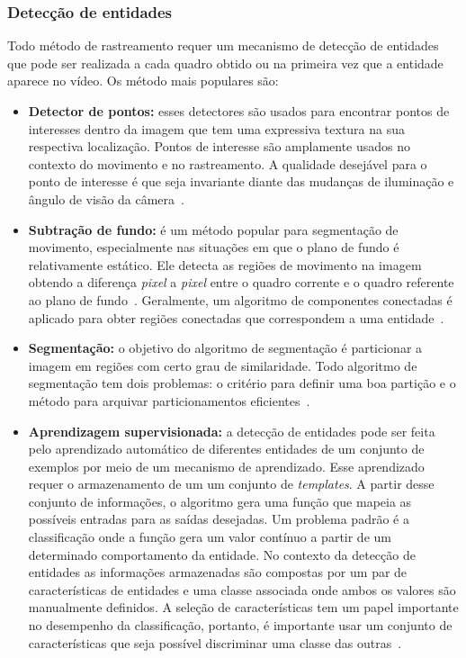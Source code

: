 \subsubsection{Detecção de entidades}
\label{sec:deteccao-objeto}

	Todo método de rastreamento requer um mecanismo de detecção de entidades que
	pode ser realizada a cada quadro obtido ou na primeira vez que a
	entidade aparece no vídeo. Os método mais populares são:


	\begin{itemize}
		\item \textbf{Detector de pontos:} esses detectores são usados para encontrar
		pontos de interesses dentro da imagem que tem uma expressiva textura na sua
		respectiva localização. Pontos de interesse são amplamente usados no contexto do
		movimento e no rastreamento. A qualidade desejável para o ponto de interesse é
		que seja invariante diante das mudanças de iluminação e ângulo de visão da
		câmera~\cite{yilmaz}.
			
		\item \textbf{Subtração de fundo:} é um método popular para segmentação de
		movimento, especialmente nas situações em que o plano de fundo é relativamente
		estático. Ele detecta as regiões de movimento na imagem obtendo a diferença
		\textit{pixel} a \textit{pixel} entre o quadro corrente e o
		quadro referente ao plano de fundo~\cite{weiming}. Geralmente, um
		algoritmo de componentes conectadas é aplicado para obter regiões conectadas que
		correspondem a uma entidade~\cite{yilmaz}.
		
		\item \textbf{Segmentação:} o objetivo do algoritmo de segmentação é particionar
		a imagem em regiões com certo grau de similaridade. Todo algoritmo de
		segmentação tem dois problemas: o critério para definir uma boa partição e o
		método para arquivar particionamentos eficientes~\cite{yilmaz, shi}.

		\item \textbf{Aprendizagem supervisionada:} a detecção de entidades pode ser
		feita pelo aprendizado automático de diferentes entidades de um conjunto de
		exemplos por meio de um mecanismo de aprendizado. Esse aprendizado requer o
		armazenamento de um um conjunto de \textit{templates}. A partir desse conjunto
		de informações, o algoritmo gera uma função que mapeia as possíveis entradas
		para as saídas desejadas. Um problema padrão é a classificação onde a função
		gera um valor contínuo a partir de um determinado comportamento da entidade. No
		contexto da detecção de entidades as informações armazenadas são compostas por
		um par de características de entidades e uma classe associada onde ambos os
		valores são manualmente definidos. A seleção de características tem um papel
		importante no desempenho da classificação, portanto, é importante usar um
		conjunto de características que seja possível discriminar uma classe das
		outras~\cite{yilmaz}.
	\end{itemize}

